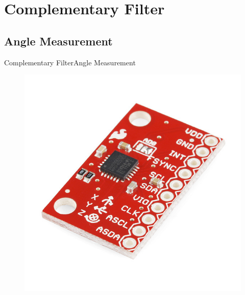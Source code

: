 \section{Complementary Filter}
\subsection{Angle Measurement}
\begin{frame}{Complementary Filter}{Angle Measurement}
	\begin{figure}
		\centering
		\includegraphics[scale=1.2]{Pictures/IMU6050.jpg}
	\end{figure}
\end{frame}
